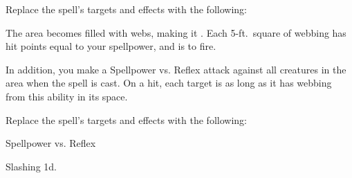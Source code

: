 


Replace the spell's targets and effects with the following:
\begin{spellcontent}

\begin{augmenttargetinginfo}




\end{augmenttargetinginfo}


\begin{augmenteffects}



\spelleffect
The area becomes filled with webs, making it .
Each 5-ft.\ square of webbing has hit points equal to your spellpower, and is  to fire.

In addition, you make a Spellpower vs. Reflex attack against all creatures in the area when the spell is cast.
On a hit, each target is \immobilized as long as it has webbing from this ability in its space.








\end{augmenteffects}

\end{spellcontent}








Replace the spell's targets and effects with the following:
\begin{spellcontent}

\begin{augmenttargetinginfo}




\end{augmenttargetinginfo}


\begin{augmenteffects}




\begin{spellattack}{Spellpower vs. Reflex}


\spellsuccess Slashing  \minus1d.


\end{spellattack}





\end{augmenteffects}

\end{spellcontent}





